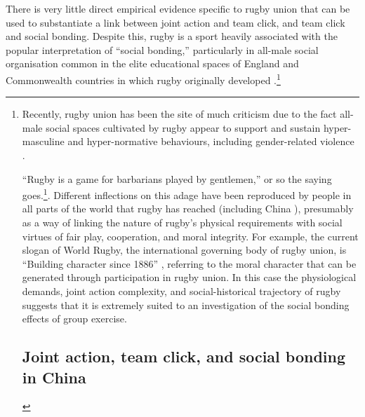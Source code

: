   There is very little direct empirical evidence specific to rugby union that can be used to substantiate a link between joint action and team click, and team click and social bonding.  Despite this, rugby is a sport heavily associated with the popular interpretation of ``social bonding,'' particularly in all-male social organisation common in the elite educational spaces of England and Commonwealth countries in which rugby originally developed \citep{Dunning2005,Richards2007,Collins2008}.\footnote{Recently, rugby union has been the site of much criticism due to the fact all-male social spaces cultivated by rugby appear to support and sustain hyper-masculine and hyper-normative behaviours, including gender-related violence \citep{Cosslett2014}.

  ``Rugby is a game for barbarians played by gentlemen,'' or so the saying goes.\footnote{The origins of this oft-cited Rugby adage is unclear.  The phrase is supposedly the adopted motto of the British Barbarians Football Club, established in 1890 \citep[34]{Dunning2005}.  The complete phrase reads ``Rugby is a game for barbarians played by gentlemen, football is a game for gentlemen played by barbarians.''  However, official club history cites its original motto as, ‘Rugby Football is a game for gentlemen in all classes, but for no bad sportsman in any class' \citep[vii]{Starmer-Smith1977}.  Some sources attribute the saying to British writer and poet Oscar Wilde (1854-1900) \citep{Fleenor2015}}. Different inflections on this adage have been reproduced by people in all parts of the world that rugby has reached (including China \cite{}), presumably as a way of linking the nature of rugby's physical requirements with social virtues of fair play, cooperation, and moral integrity. For example, the current slogan of World Rugby, the international governing body of rugby union, is ``Building character since 1886'' \citep{WorldRugby2017}, referring to the moral character that can be generated through participation in rugby union.  In this case the physiological demands, joint action complexity, and social-historical trajectory of rugby suggests that it is extremely suited to an investigation of the social bonding effects of group exercise.



  \subsection{Joint action, team click, and social bonding in China}

}

